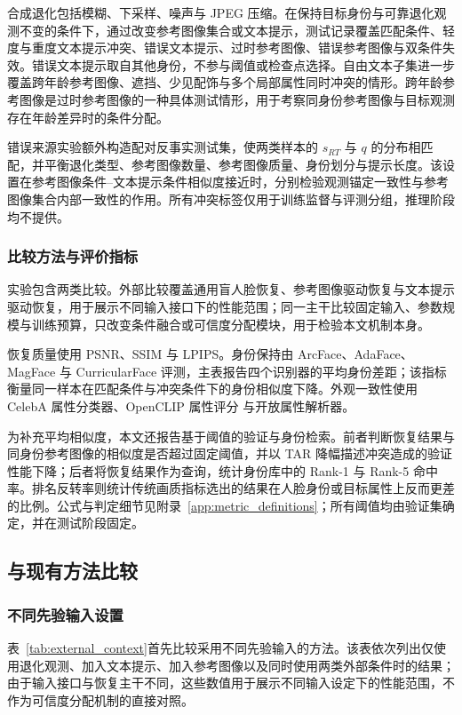 \documentclass[journal]{IEEEtran}
\begin{document}
合成退化包括模糊、下采样、噪声与 JPEG 压缩\cite{wang2021gfpgan,zhou2022codeformer,wang2023dr2}。在保持目标身份与可靠退化观测不变的条件下，通过改变参考图像集合或文本提示，测试记录覆盖匹配条件、轻度与重度文本提示冲突、错误文本提示、过时参考图像、错误参考图像与双条件失效。错误文本提示取自其他身份，不参与阈值或检查点选择。自由文本子集进一步覆盖跨年龄参考图像、遮挡、少见配饰与多个局部属性同时冲突的情形。跨年龄参考图像是过时参考图像的一种具体测试情形，用于考察同身份参考图像与目标观测存在年龄差异时的条件分配。

错误来源实验额外构造配对反事实测试集，使两类样本的 $s_{RT}$ 与 $q$ 的分布相匹配，并平衡退化类型、参考图像数量、参考图像质量、身份划分与提示长度。该设置在参考图像条件--文本提示条件相似度接近时，分别检验观测锚定一致性与参考图像集合内部一致性的作用。所有冲突标签仅用于训练监督与评测分组，推理阶段均不提供。

\subsubsection{比较方法与评价指标}
实验包含两类比较。外部比较覆盖通用盲人脸恢复、参考图像驱动恢复与文本提示驱动恢复，用于展示不同输入接口下的性能范围；同一主干比较固定输入、参数规模与训练预算，只改变条件融合或可信度分配模块，用于检验本文机制本身。

恢复质量使用 PSNR、SSIM\cite{wang2004ssim} 与 LPIPS\cite{zhang2018lpips}。身份保持由 ArcFace、AdaFace、MagFace 与 CurricularFace 评测\cite{deng2019arcface,kim2022adaface,meng2021magface,huang2020curricularface}，主表报告四个识别器的平均身份差距；该指标衡量同一样本在匹配条件与冲突条件下的身份相似度下降。外观一致性使用 CelebA 属性分类器\cite{liu2015faceattributes}、OpenCLIP 属性评分\cite{radford2021clip,ilharco2021openclip} 与开放属性解析器。

为补充平均相似度，本文还报告基于阈值的验证与身份检索。前者判断恢复结果与同身份参考图像的相似度是否超过固定阈值，并以 TAR 降幅描述冲突造成的验证性能下降；后者将恢复结果作为查询，统计身份库中的 Rank-1 与 Rank-5 命中率。排名反转率则统计传统画质指标选出的结果在人脸身份或目标属性上反而更差的比例。公式与判定细节见附录~\ref{app:metric_definitions}；所有阈值均由验证集确定，并在测试阶段固定。

\subsection{与现有方法比较}
\subsubsection{不同先验输入设置}
表~\ref{tab:external_context}首先比较采用不同先验输入的方法。该表依次列出仅使用退化观测、加入文本提示、加入参考图像以及同时使用两类外部条件时的结果；由于输入接口与恢复主干不同，这些数值用于展示不同输入设定下的性能范围，不作为可信度分配机制的直接对照。
\end{document}
